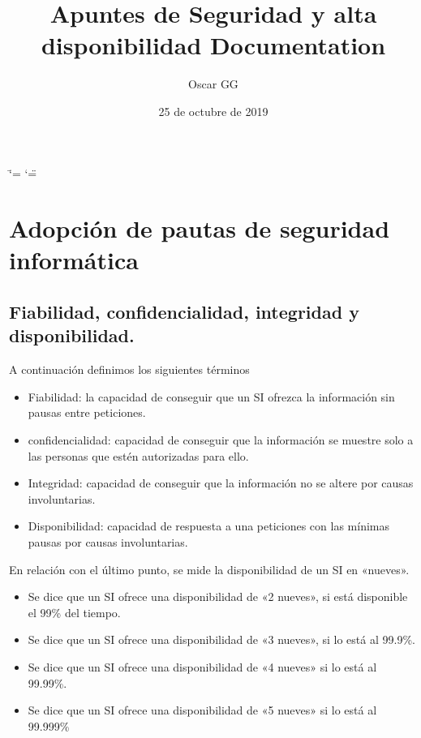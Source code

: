 \documentclass[letterpaper,10pt,spanish]{sphinxmanual}
\title{Apuntes de Seguridad y alta disponibilidad Documentation}
\date{25 de octubre de 2019}
\author{Oscar GG}
\begin{document}
\ifdefined\shorthandoff
  \ifnum\catcode`\=\string=\active\shorthandoff{=}\fi
  \ifnum\catcode`\"=\active{}\fi
\fi

\pagestyle{empty}
\sphinxmaketitle
\pagestyle{plain}
\sphinxtableofcontents
\pagestyle{normal}
\label{\detokenize{index::doc}}



\chapter{Adopción de pautas de seguridad informática}
\label{\detokenize{tema_pautas_seguridad_informatica/tema_pautas_seguridad_informatica:adopcion-de-pautas-de-seguridad-informatica}}\label{\detokenize{tema_pautas_seguridad_informatica/tema_pautas_seguridad_informatica::doc}}

\section{Fiabilidad, confidencialidad, integridad y disponibilidad.}
\label{\detokenize{tema_pautas_seguridad_informatica/tema_pautas_seguridad_informatica:fiabilidad-confidencialidad-integridad-y-disponibilidad}}
A continuación definimos los siguientes términos
\begin{itemize}
\item {} 
Fiabilidad: la capacidad de conseguir que un SI ofrezca la información sin pausas entre peticiones.

\item {} 
confidencialidad: capacidad de conseguir que la información se muestre solo a las personas que estén autorizadas para ello.

\item {} 
Integridad: capacidad de conseguir que la información no se altere por causas involuntarias.

\item {} 
Disponibilidad: capacidad de respuesta a una peticiones con las mínimas pausas por causas involuntarias.

\end{itemize}

En relación con el último punto, se mide la disponibilidad de un SI en «nueves».
\begin{itemize}
\item {} 
Se dice que un SI ofrece una disponibilidad de «2 nueves», si está disponible el 99\% del tiempo.

\item {} 
Se dice que un SI ofrece una disponibilidad de «3 nueves», si lo está al 99.9\%.

\item {} 
Se dice que un SI ofrece una disponibilidad de «4 nueves» si lo está al 99.99\%.

\item {} 
Se dice que un SI ofrece una disponibilidad de «5 nueves» si lo está al 99.999\%

\end{itemize}
\end{document}
